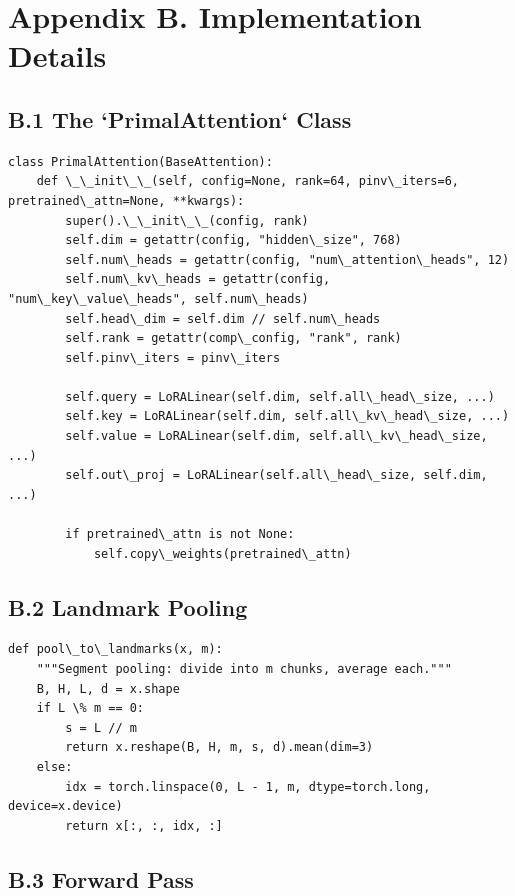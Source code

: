 
\section{Appendix B. Implementation Details}

\subsection{B.1 The `PrimalAttention` Class}

\begin{lstlisting}
class PrimalAttention(BaseAttention):
    def \_\_init\_\_(self, config=None, rank=64, pinv\_iters=6, pretrained\_attn=None, **kwargs):
        super().\_\_init\_\_(config, rank)
        self.dim = getattr(config, "hidden\_size", 768)
        self.num\_heads = getattr(config, "num\_attention\_heads", 12)
        self.num\_kv\_heads = getattr(config, "num\_key\_value\_heads", self.num\_heads)
        self.head\_dim = self.dim // self.num\_heads
        self.rank = getattr(comp\_config, "rank", rank)
        self.pinv\_iters = pinv\_iters
        
        self.query = LoRALinear(self.dim, self.all\_head\_size, ...)
        self.key = LoRALinear(self.dim, self.all\_kv\_head\_size, ...)
        self.value = LoRALinear(self.dim, self.all\_kv\_head\_size, ...)
        self.out\_proj = LoRALinear(self.all\_head\_size, self.dim, ...)
        
        if pretrained\_attn is not None:
            self.copy\_weights(pretrained\_attn)
\end{lstlisting}

\subsection{B.2 Landmark Pooling}

\begin{lstlisting}
def pool\_to\_landmarks(x, m):
    """Segment pooling: divide into m chunks, average each."""
    B, H, L, d = x.shape
    if L \% m == 0:
        s = L // m
        return x.reshape(B, H, m, s, d).mean(dim=3)
    else:
        idx = torch.linspace(0, L - 1, m, dtype=torch.long, device=x.device)
        return x[:, :, idx, :]
\end{lstlisting}

\subsection{B.3 Forward Pass}

